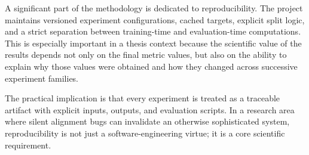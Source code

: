 A significant part of the methodology is dedicated to reproducibility. The project maintains versioned experiment configurations, cached targets, explicit split logic, and a strict separation between training-time and evaluation-time computations. This is especially important in a thesis context because the scientific value of the results depends not only on the final metric values, but also on the ability to explain why those values were obtained and how they changed across successive experiment families.

The practical implication is that every experiment is treated as a traceable artifact with explicit inputs, outputs, and evaluation scripts. In a research area where silent alignment bugs can invalidate an otherwise sophisticated system, reproducibility is not just a software-engineering virtue; it is a core scientific requirement.
